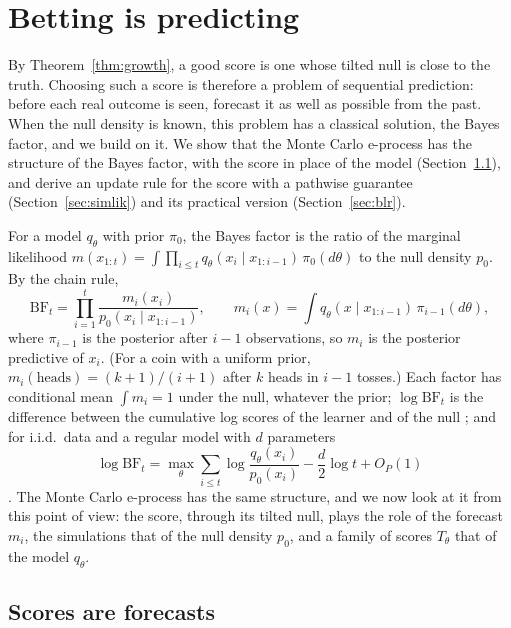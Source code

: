 \documentclass[12pt]{article}
\theoremstyle{remark}
\begin{document}
\section{Betting is predicting}\label{sec:predictive}

By Theorem~\ref{thm:growth}, a good score is one whose tilted null is close
to the truth. Choosing such a score is therefore a problem of
sequential prediction: before each real outcome is seen, forecast it as well
as possible from the past. When the null density is known, this problem has a
classical solution, the Bayes factor, and we build on it. We show that the Monte Carlo e-process has the structure of the Bayes factor, with the score in place of the model (Section~\ref{sec:scores}), and derive an update rule for the score with a pathwise guarantee (Section~\ref{sec:simlik}) and its practical version (Section~\ref{sec:blr}).

For a model $q_\theta$ with prior $\pi_0$, the Bayes factor is the ratio of
the marginal likelihood $m(x_{1:t}) = \int \prod_{i \le t} q_\theta(x_i \mid x_{1:i-1})\,
\pi_0(d\theta)$ to the null density $p_0$. By the chain rule,
\begin{equation}\label{eq:prequential}
\mathrm{BF}_t = \prod_{i=1}^{t} \frac{m_i(x_i)}{p_0(x_i \mid x_{1:i-1})},
\qquad
m_i(x) = \int q_\theta(x \mid x_{1:i-1})\,\pi_{i-1}(d\theta),
\end{equation}
where $\pi_{i-1}$ is the posterior after $i-1$ observations, so $m_i$ is the
posterior predictive of $x_i$. (For a coin with a uniform prior,
$m_i(\text{heads}) = (k+1)/(i+1)$ after $k$ heads in $i-1$ tosses.) Each
factor has conditional mean $\int m_i = 1$ under the null, whatever the prior;
$\log \mathrm{BF}_t$ is the difference between the cumulative log scores of
the learner and of the null \citep{dawid1984present}; and for i.i.d.\ data
and a regular model with $d$ parameters
\[
\log \mathrm{BF}_t = \max_\theta \sum_{i \le t} \log\frac{q_\theta(x_i)}{p_0(x_i)}
- \frac d2 \log t + O_P(1)
\]
\citep{clarke1990information}. The Monte Carlo e-process has the same
structure, and we now look at it from this point of view: the score, through
its tilted null, plays the role of the forecast $m_i$, the simulations that of
the null density $p_0$, and a family of scores $T_\theta$ that of the model
$q_\theta$.

\subsection{Scores are forecasts}\label{sec:scores}
\end{document}
